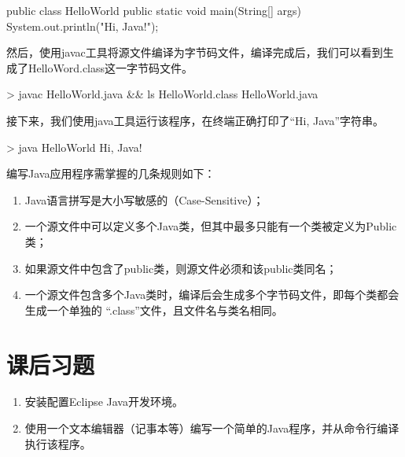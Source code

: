 \begin{javaCode}
public class HelloWorld {
    public static void main(String[] args) {
	System.out.println("Hi, Java!");
    }
}   
\end{javaCode}

然后，使用javac工具将源文件编译为字节码文件，编译完成后，我们可以看到生成了HelloWord.class这一字节码文件。

\begin{shCode}
  > javac HelloWorld.java && ls 
  HelloWorld.class  HelloWorld.java
\end{shCode}

接下来，我们使用java工具运行该程序，在终端正确打印了“Hi, Java”字符串。

\begin{shCode}
  > java HelloWorld 
  Hi, Java!
\end{shCode}



编写Java应用程序需掌握的几条规则如下：

\begin{enumerate}
\item Java语言拼写是大小写敏感的（Case-Sensitive）；
\item 一个源文件中可以定义多个Java类，但其中最多只能有一个类被定义为Public类；
\item 如果源文件中包含了public类，则源文件必须和该public类同名；
\item 一个源文件包含多个Java类时，编译后会生成多个字节码文件，即每个类都会生成一个单独的
  “.class”文件，且文件名与类名相同。
\end{enumerate}

\section{课后习题}

\begin{enumerate}
\item 安装配置Eclipse Java开发环境。
\item 使用一个文本编辑器（记事本等）编写一个简单的Java程序，并从命令行编译执行该程序。
\end{enumerate}